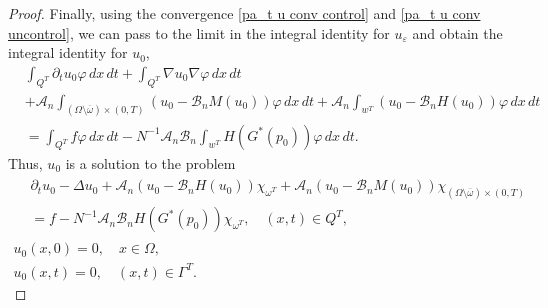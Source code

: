 \documentclass[reqno]{amsart}
\begin{document}
\begin{proof}
Finally, using the convergence \eqref{pa_t u conv control} and
\eqref{pa_t u conv uncontrol}, we can pass to the limit in the integral 
identity for $u_{\varepsilon }$ and obtain the integral identity for $u_0$,
\begin{equation}
\begin{aligned}
&\int _{Q^{T}}\partial _{t}u_0\varphi \,dx\,dt+\int
_{Q^{T}}\nabla u_0\nabla \varphi \,dx\,dt    \\
&+\mathcal{A}_n\int _{(\Omega \setminus \overline{\omega })\times
(0,T)}(u_0-\mathcal{B}_nM(u_0))\varphi \,dx\,dt+\mathcal{A}_n\int
_{w^{T}}(u_0-\mathcal{B}_nH(u_0))\varphi\,dx\,dt    \\
&=\int _{Q^{T}}f\varphi \,dx\,dt-N^{-1}\mathcal{A}_n\mathcal{B}%
_n\int _{w^{T}}H(G^{\ast }(p_0))\varphi \,dx\,dt.
\end{aligned} \label{u_0 int ident}
\end{equation}
Thus, $u_0$ is a solution to the  problem
\begin{gather*}
\begin{aligned}
&\partial _{t}u_0-\Delta u_0+\mathcal{A}_n(u_0-\mathcal{B}%
_nH(u_0))\chi _{\omega ^{T}}
+\mathcal{A}_n(u_0-\mathcal{B}_nM(u_0))\chi _{(\Omega \setminus
\overline{\omega })\times (0,T)} \\
&=f-N^{-1}\mathcal{A}_n\mathcal{B}_nH(G^{\ast }(p_0))
\chi _{\omega ^{T}}, \quad (x,t)\in Q^{T},
\end{aligned} \\
u_0(x,0)=0, \quad x\in \Omega , \\
u_0(x,t)=0, \quad (x,t)\in \Gamma ^{T}.
\end{gather*}


\end{proof}
\end{document}
